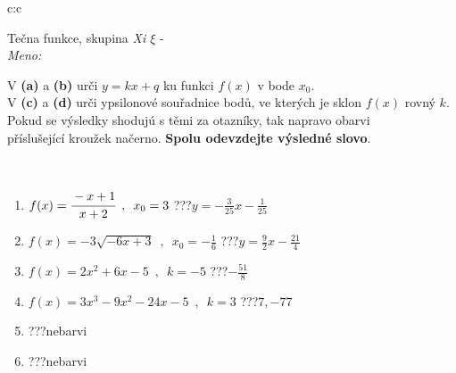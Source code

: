 \documentclass[10pt]{report}
\begin{document}
\newpage
\thispagestyle{empty}
\begin{tabular}{c:c}
\begin{minipage}[c][104.5mm][t]{0.5\linewidth}
\begin{center}
\vspace{7mm}
{\huge Tečna funkce, skupina \textit{Xi $\xi$} -}\\[5mm]
\textit{Meno:}\phantom{xxxxxxxxxxxxxxxxxxxxxxxxxxxxxxxxxxxxxxxxxxxxxxxxxxxxxxxxxxxxxxxxx}\\[5mm]
\begin{minipage}{0.95\linewidth}
\begin{center}
V \textbf{(a)} a \textbf{(b)} urči  $y = kx + q$ ku funkci $f(x)$ v bode $x_0$.\\V \textbf{(c)} a \textbf{(d)} urči ypsilonové souřadnice bodů, ve kterých je sklon $f(x)$ rovný $k$.\\Pokud se výsledky shodujú s těmi za otazníky, tak napravo obarvi\\příslušející kroužek načerno. \textbf{Spolu odevzdejte výsledné slovo}.
\end{center}
\end{minipage}
\\[1mm]
\begin{minipage}{0.79\linewidth}
\begin{center}
\begin{varwidth}{\linewidth}
\begin{enumerate}
\small
\item $f(x)=\cfrac{-x+1}{x+2}\enspace , \enspace x_0=3$\quad \dotfill\; ???\;\dotfill \quad $y = -\frac{3}{25}x-\frac{1}{25}$
\item $f(x)=-3\sqrt{-6x+3}\enspace , \enspace x_0=-\frac{1}{6}$\quad \dotfill\; ???\;\dotfill \quad $y = \frac{9}{2}x-\frac{21}{4}$
\item $f(x)=2x^2+6x-5\enspace , \enspace k=-5$\quad \dotfill\; ???\;\dotfill \quad $-\frac{51}{8}$
\item $f(x)=3x^3-9x^2-24x-5\enspace , \enspace k=3$\quad \dotfill\; ???\;\dotfill \quad $7 , -77$
\item \quad \dotfill\; ???\;\dotfill \quad nebarvi
\item \quad \dotfill\; ???\;\dotfill \quad nebarvi
\end{enumerate}
\end{varwidth}
\end{center}
\end{minipage}
\begin{minipage}{0.20\linewidth}

\end{minipage}
\end{center}
\end{minipage}
\end{tabular}
\end{document}
